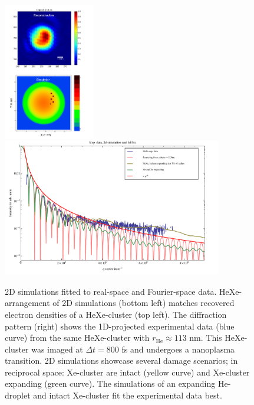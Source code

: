 \begin{figure}
	\centering
		\includegraphics[height=6.0cm]{images/results/HeXe-densities-113-05-doping-and-reconstruction.png}
		\includegraphics[height=6.0cm]{images/results/HeXe-cluster-113-0-5-doping.pdf}
	\caption[Simulation and exp. data: Structural damage in He-droplet.]{2D simulations fitted to real-space and Fourier-space data. HeXe-arrangement of 2D simulations (bottom left) matches recovered electron densities of a HeXe-cluster (top left). The diffraction pattern (right) shows the 1D-projected experimental data (blue curve) from the same HeXe-cluster with $r_{\text{He}}\approx 113$ nm. This HeXe-cluster was imaged at $\Delta t=800$ fs and undergoes a nanoplasma transition. 2D simulations showcase several damage scenarios; in reciprocal space: Xe-cluster are intact (yellow curve) and Xe-cluster expanding (green curve). The simulations of an expanding He-droplet and intact Xe-cluster fit the experimental data best.}
	\label{fig:HeXe-cluster-113-0.5}
\end{figure}
